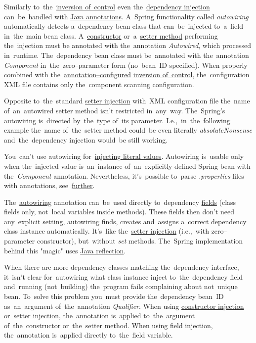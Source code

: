 \label{autowiring}
Similarly to~the~\hyperref[springinversionofcontrol]{inversion of~control} even the~\hyperref[springdependencyinjection]{dependency injection} can~be~handled with \hyperref[javaannotation]{Java annotations}. A~Spring functionality called \textit{autowiring} automatically detects a~dependency bean class that can~be~injected to~a~field in~the~main bean class. A~\hyperref[constructorinjection]{constructor} or~a~\hyperref[setterinjection]{setter method} performing the~injection must be annotated with the~annotation \textit{Autowired}, which processed in~runtime. The~dependency bean class must be~annotated with the~annotation \textit{Component} in~the~zero--parameter form (no~bean~ID specified). When properly combined with the~\hyperref[iocannotations]{annotation--configured} \hyperref[springinversionofcontrol]{inversion of~control}, the~configuration XML file contains only the~component scanning configuration.

\note Opposite to~the~standard \hyperref[setterinjection]{setter injection} with~XML configuration file the~name of~an~autowired setter method isn't restricted in~any~way. The~Spring's autowiring is~directed by~the~type of~its parameter. I.e.,~in~the~following example the~name of~the~setter method could~be even literally \textit{absoluteNonsense} and~the~dependency injection would~be still working.

\warning You~can't use autowiring for~\hyperref[injectingliteralvalues]{injecting literal values}. Autowiring is~usable only when the~injected value is~an~instance of~an~explicitly defined Spring bean with the~\textit{Component} annotation. Nevertheless, it's~possible to~parse \textit{.properties} files with annotations, see~\hyperref[readingpropertiesannotations]{further}.

\label{fieldinjection}
The~\hyperref[autowiring]{autowiring} annotation can~be~used directly to~dependency \hyperref[variablefieldproperty]{fields} (class fields only, not~local variables inside methods). These fields then don't need any~explicit setting, autowiring finds, creates and~assigns a~correct dependency class instance automatically. It's~like the~\hyperref[setterinjection]{setter injection} (i.e.,~with zero--parameter constructor), but~without \textit{set} methods. The~Spring implementation behind this "magic" uses \hyperref[reflection]{Java reflection}.

When there are more dependency classes matching the~dependency interface, it~isn't clear for~autowiring what class instance inject to~the~dependency field and~running (not~building) the~program fails complaining about not~unique bean. To~solve this problem you~must provide the~dependency bean~ID as~an~argument of~the~annotation \textit{Qualifier}. When using \hyperref[constructorinjectionautowire]{constructor injection} or~\hyperref[setterinjectionautowire]{setter injection}, the~annotation is~applied to~the~argument of~the~constructor or~the~setter method. When using field injection, the~annotation is~applied directly to~the~field variable.
\newpage

